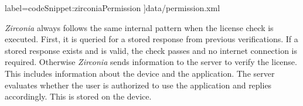   label={codeSnippet:zirconiaPermission}
]{data/permission.xml}


\textit{Zirconia} always follows the same internal pattern when the license check is executed.
First, it is queried for a stored response from previous verifications.
If a stored response exists and is valid, the check passes and no internet connection is required.
Otherwise \textit{Zirconia} sends information to the server to verify the license.
This includes information about the device and the application.
The server evaluates whether the user is authorized to use the application and replies accordingly.
This is stored on the device. \cite{samsungZirconia}

